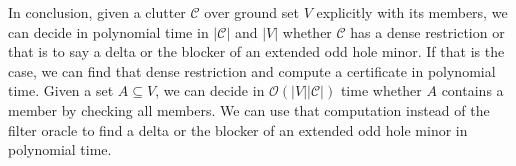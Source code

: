 \documentclass[a4paper, 12pt]{scrbook}
\theoremstyle{definition}
\begin{document}
   In conclusion, given a clutter $\mathcal{C}$ over ground set $V$ explicitly with its members, we can decide in polynomial time in $|\mathcal{C}|$ and $|V|$ whether $\mathcal{C}$ has a dense restriction or that is to say a delta or the blocker of an extended odd hole minor.
   If that is the case, we can find that dense restriction and compute a certificate in polynomial time.
   Given a set $A \subseteq V$, we can decide in $\mathcal{O}(|V||\mathcal{C}|)$ time whether $A$ contains a member by checking all members. We can use that computation instead of the filter oracle to find a delta or the blocker of an extended odd hole minor in polynomial time.







   \printbibliography[title={References}]
\end{document}
